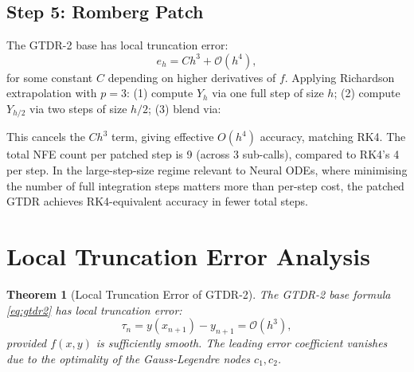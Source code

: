 \documentclass[conference]{IEEEtran}
\newtheorem{theorem}{Theorem}
\begin{document}
\subsection{Step 5: Romberg Patch}

The GTDR-2 base has local truncation error:
%
\begin{equation}
    e_h = C h^3 + \mathcal{O}(h^4),
\end{equation}
%
for some constant $C$ depending on higher derivatives of $f$.
Applying Richardson extrapolation with $p = 3$:
(1) compute $Y_h$ via one full step of size $h$;
(2) compute $Y_{h/2}$ via two steps of size $h/2$;
(3) blend via:

\medskip
\noindent\begin{minipage}{\linewidth}
\centering
{}
\end{minipage}
\medskip

This cancels the $C h^3$ term, giving effective $O(h^4)$ accuracy,
matching RK4. The total NFE count per patched step is 9 (across 3
sub-calls), compared to RK4's 4 per step. In the large-step-size regime
relevant to Neural ODEs, where minimising the number of full integration
steps matters more than per-step cost, the patched GTDR achieves
RK4-equivalent accuracy in fewer total steps.

\section{Local Truncation Error Analysis}
\label{sec:error}

\begin{theorem}[Local Truncation Error of GTDR-2]
\label{thm:lte}
The GTDR-2 base formula \eqref{eq:gtdr2} has local truncation error:
\begin{equation}
    \tau_n = y(x_{n+1}) - y_{n+1} = \mathcal{O}(h^3),
\end{equation}
provided $f(x,y)$ is sufficiently smooth. The leading error coefficient
vanishes due to the optimality of the Gauss-Legendre nodes $c_1, c_2$.
\end{theorem}
\end{document}
